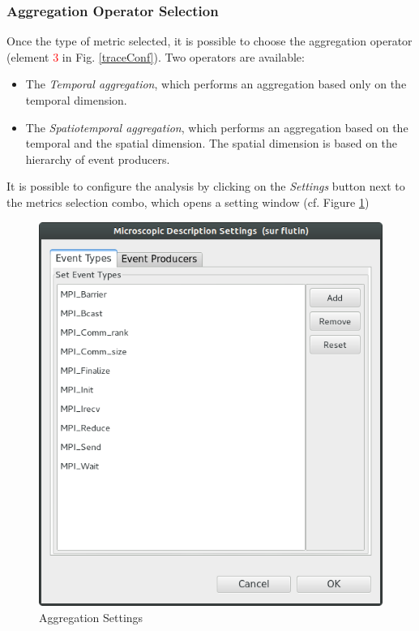 \documentclass[twoside]{article}
\begin{document}
\begin{sloppypar}
\subsubsection{Aggregation Operator Selection}
Once the type of metric selected, it is possible to choose the aggregation operator (element \textcolor{red}{3} in Fig. \ref{traceConf}). Two operators are available:
\begin{itemize}
	\item The \textit{Temporal aggregation}, which performs an aggregation based only on the temporal dimension.
	\item The \textit{Spatiotemporal aggregation}, which performs an aggregation based on the temporal and the spatial dimension. The spatial dimension is based on the hierarchy of event producers.
\end{itemize}

It is possible to configure the analysis by clicking on the \textit{Settings} button next to the metrics selection combo, which opens a setting window (cf. Figure \ref{microSettings})

\begin{figure}[h!]
	\centering
	\includegraphics[scale=0.4]{images/state_settings.png}
	\caption{Aggregation Settings}
	\label{microSettings}
\end{figure}


\end{sloppypar}
\end{document}
